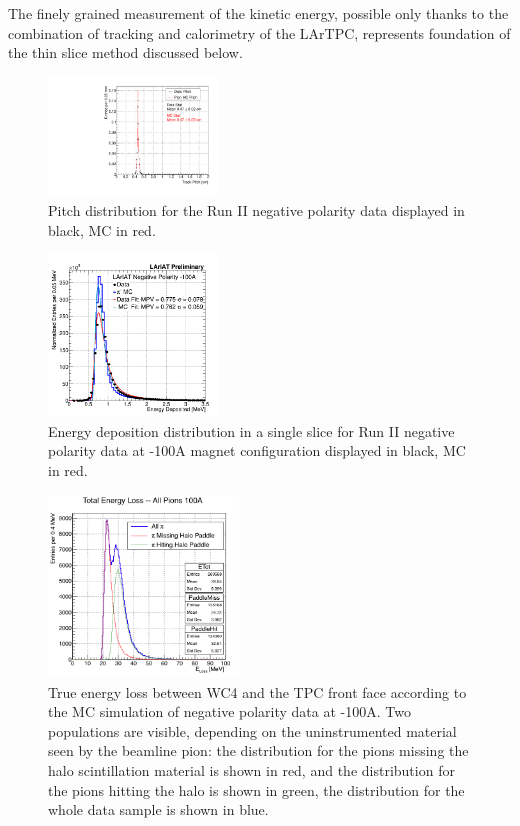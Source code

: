 \documentclass[aps,prl,twocolumn,showpacs,superscriptaddress,groupedaddress]{revtex4}  %
\begin{document}
The finely grained measurement of the kinetic energy, possible only thanks to the combination of tracking and calorimetry of the LArTPC, represents foundation of the thin slice method discussed below.\\

\begin{figure}
\includegraphics[width =0.4\textwidth ]{PitchPi}
\caption{\label{fig:pitch}  Pitch distribution for the Run II negative polarity data displayed in black, MC in red.}
\end{figure}
\begin{figure}
\includegraphics[width =0.4\textwidth ]{DepEnergy_Fit_v4100A.png}
\caption{\label{fig:enDep}  Energy deposition distribution in a single slice for Run II negative polarity data at -100A magnet configuration displayed in black, MC in red.}
\end{figure}

\begin{figure}
\centering
\includegraphics[width=0.45\textwidth]{E_loss100A.png}
\caption{\label{fig:ELoss100A}  True energy loss between WC4 and the TPC front face according to the MC simulation of negative polarity data at -100A. Two populations are visible, depending on the uninstrumented material seen by the beamline pion: the distribution for the pions missing the halo scintillation material is shown in red, and the distribution for the pions hitting the halo is shown in green, the distribution for the whole data sample is shown in blue.  }
\end{figure}
\end{document}
